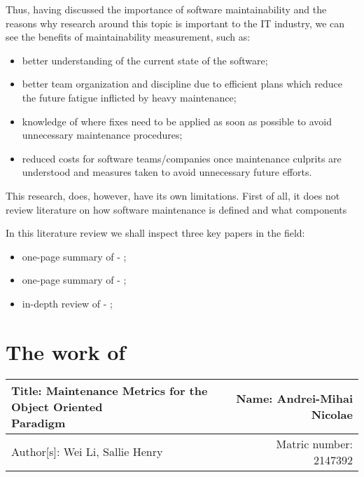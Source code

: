 \documentclass[a4paper,portrait,12pt]{article}
\begin{document}
  Thus, having discussed the importance of software maintainability and the
  reasons why research around this topic is important to the IT industry,
  we can see the benefits of maintainability measurement, such as:
    \begin{itemize}
      \item better understanding of the current state of the software;
      \item better team organization and discipline due to efficient plans 
      which reduce the future fatigue inflicted by heavy maintenance;
      \item knowledge of where fixes need to be applied as soon as possible
      to avoid unnecessary maintenance procedures;
      \item reduced costs for software teams/companies once maintenance 
      culprits are understood and measures taken to avoid unnecessary future
      efforts.
    \end{itemize}

  This research, does, however, have its own limitations. First of all, it does
  not review literature on how software maintenance is defined and what 
  components 
  
  In this literature review we shall inspect three key papers in the field:
    \begin{itemize}
      \item one-page summary of \citet{oman1992metrics} - ;
      \item one-page summary of \citet{pfleeger1990framework} - ;
      \item in-depth review of \citet{li1993maintenance} - ;
    \end{itemize}

\section{The work of \cite{li1993maintenance}}

 \begin{center}
   \begin{tabular}{ | l | r | }
    \hline
    \parbox[t]{5cm}{Title: Maintenance Metrics for the Object Oriented
                    \\ Paradigm} 
     & Name: Andrei-Mihai Nicolae \\ 
     \hline
     Author[s]: Wei Li, Sallie Henry & Matric number: 2147392 \\
    \hline
   \end{tabular}
 \end{center}
\end{document}
